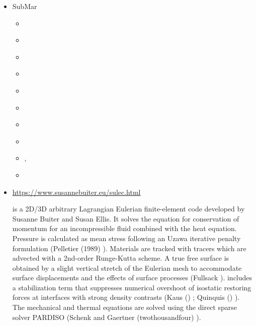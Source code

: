 \begin{itemize}
\item {\codefont SubMar} 

\begin{scriptsize}
\begin{itemize}
\item[\twothousandsix]       \textcite{masr06}
\item[\twothousandseven]     \textcite{masp07}
\item[\twothousandten]       \textcite{roms10}
\item[\twothousandtwelve]    \textcite{rosm12}
\item[\twothousandthirteen]  \textcite{rems13}
\item[\twothousandseventeen] \textcite{rerm17}
\item[\twothousandeighteen]  \textcite{marc18}
\item[\twothousandnineteen]  \textcite{rors19}
\item[\twothousandtwenty]    \textcite{rozr20}, \textcite{relr20}
\item[\twothousandtwentyone] \textcite{resr21}
\end{itemize}
\end{scriptsize}

\item \sulec {}

\url{https://www.susannebuiter.eu/sulec.html}

\sulec is a 2D/3D arbitrary Lagrangian Eulerian finite-element 
code developed by Susanne Buiter and Susan Ellis. 
It solves the equation for conservation of momentum for an incompressible fluid combined with 
the heat equation. Pressure is calculated as mean stress following an Uzawa iterative penalty 
formulation (Pelletier \etal (1989) \cite{pefc89}). 
Materials are tracked with tracers which are advected with a 2nd-order Runge-Kutta scheme. 
A true free surface is obtained by a slight vertical stretch of the Eulerian mesh to 
accommodate surface displacements and the effects of surface processes (Fullsack \nineteenninetyfive \cite{full95}). 
\sulec includes a stabilization term that suppresses numerical overshoot of isostatic restoring forces 
at interfaces with strong density contrasts (Kaus \etal (\twothousandten) \cite{kamm10}; 
Quinquis \etal (\twothousandeleven) \cite{qube11}). The mechanical and thermal equations are solved using 
the direct sparse solver PARDISO (Schenk and Gaertner (twothousandfour) \cite{scga04}).


\end{itemize}

